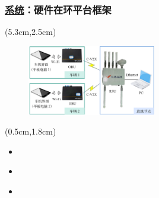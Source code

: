 \begin{frame}
\frametitle{\englishfont \underline{系统}：硬件在环平台框架}
\newBackground
\begin{center}
\begin{textblock*}{\textwidth}(5.3cm,2.5cm)
\begin{figure}
\includegraphics[width=0.5\textwidth]{fig/Fig5-8-hardware-in-the-loop-architecture.pdf}
\end{figure}
\end{textblock*}
\end{center}

\begin{center}
\begin{textblock*}{0.55\textwidth}(0.5cm,1.8cm)
\begin{itemize}[itemsep=0.2\baselineskip] \englishfont 
	\item[\ding{111}] {\color{cqublue}{硬件设备}}
	\begin{itemize}[itemsep=0.2\baselineskip]
	\end{itemize}
	\item[\ding{111}] {\color{cqublue}{车端}}
	\begin{itemize}[itemsep=0.2\baselineskip]
	\end{itemize}
	\item[\ding{111}] {\color{cqublue}{边缘端}}
	\begin{itemize}[itemsep=0.2\baselineskip]
	\end{itemize}
\end{itemize}
\end{textblock*}
\end{center}
\end{frame}

